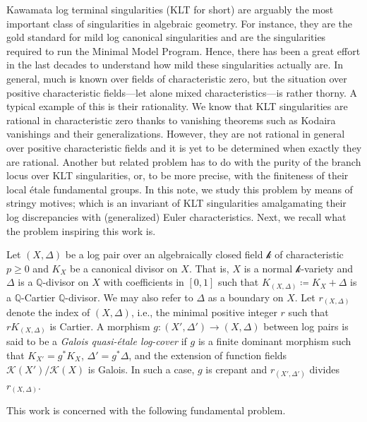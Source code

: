 \documentclass[12pt]{amsart}
\theoremstyle{plain}   %
\theoremstyle{definition}    %
\theoremstyle{remark}    %
\numberwithin{equation}{theorem}
\newcommand{\kay}{\mathcal{k}}
\newcommand{\sK}{\mathcal{K}}
\newcommand{\bQ}{\mathbb{Q}}
\begin{document}
Kawamata log terminal singularities (KLT for short) are arguably the most important class of singularities in algebraic geometry. For instance, they are the gold standard for mild log canonical singularities and are the singularities required to run the Minimal Model Program. Hence, there has been a great effort in the last decades to understand how mild these singularities actually are. In general, much is known over fields of characteristic zero, but the situation over positive characteristic fields---let alone mixed characteristics---is rather thorny. A typical example of this is their rationality. We know that KLT singularities are rational in characteristic zero thanks to vanishing theorems such as Kodaira vanishings and their generalizations. However, they are not rational in general over positive characteristic fields and it is yet to be determined when exactly they are rational. Another but related problem has to do with the purity of the branch locus over KLT singularities, or, to be more precise, with the finiteness of their local \'etale fundamental groups. In this note, we study this problem by means of stringy motives; which is an invariant of KLT singularities amalgamating their log discrepancies with (generalized) Euler characteristics. Next, we recall what the problem inspiring this work is. 

Let $(X,\Delta)$ be a log pair over an algebraically closed field $\kay$ of characteristic $p\geq 0$ and $K_X$ be a canonical divisor on $X$. That is, $X$ is a normal $\kay$-variety and $\Delta$ is a $\bQ$-divisor on $X$ with coefficients in $[0,1]$ such that $K_{(X,\Delta)} \coloneqq K_X + \Delta$ is a $\bQ$-Cartier $\bQ$-divisor. We may also refer to $\Delta$ as a boundary on $X$. Let $r_{(X,\Delta)}$ denote the index of $(X,\Delta)$, i.e., the minimal positive integer $r$ such that $rK_{(X,\Delta)}$ is Cartier. A morphism $g\colon (X',\Delta') \to (X,\Delta)$ between log pairs is said to be a \emph{Galois quasi-\'etale log-cover} if $g$ is a finite dominant morphism such that $K_{X'}= g^*K_X$, $\Delta' = g^*\Delta$, and the extension of function fields $\sK(X')/\sK(X)$ is Galois. In such a case, $g$ is crepant and $r_{(X',\Delta')}$ divides $r_{(X,\Delta)}$. 

This work is concerned with the following fundamental problem.
\end{document}
